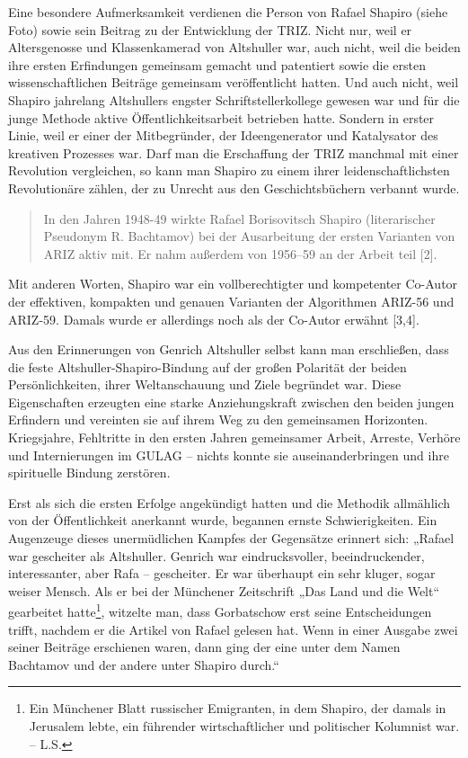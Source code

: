 \documentclass[11pt,a4paper]{article}
\begin{document}
Eine besondere Aufmerksamkeit verdienen die Person von Rafael Shapiro (siehe
Foto) sowie sein Beitrag zu der Entwicklung der TRIZ. Nicht nur, weil er
Altersgenosse und Klassenkamerad von Altshuller war, auch nicht, weil die
beiden ihre ersten Erfindungen gemeinsam gemacht und patentiert sowie die
ersten wissenschaftlichen Beiträge gemeinsam veröffentlicht hatten. Und auch
nicht, weil Shapiro jahrelang Altshullers engster Schriftstellerkollege
gewesen war und für die junge Methode aktive Öffentlichkeitsarbeit betrieben
hatte. Sondern in erster Linie, weil er einer der Mitbegründer, der
Ideengenerator und Katalysator des kreativen Prozesses war. Darf man die
Erschaffung der TRIZ manchmal mit einer Revolution vergleichen, so kann man
Shapiro zu einem ihrer leidenschaftlichsten Revolutionäre zählen, der zu
Unrecht aus den Geschichtsbüchern verbannt wurde.
\begin{quote}
  In den Jahren 1948-49 wirkte Rafael Borisovitsch Shapiro (literarischer
  Pseudonym R. Bachtamov) bei der Ausarbeitung der ersten Varianten von ARIZ
  aktiv mit. Er nahm außerdem von 1956--59 an der Arbeit teil [2].
\end{quote}
Mit anderen Worten, Shapiro war ein vollberechtigter und kompetenter Co-Autor
der effektiven, kompakten und genauen Varianten der Algorithmen ARIZ-56 und
ARIZ-59. Damals wurde er allerdings noch als der Co-Autor erwähnt [3,4].

Aus den Erinnerungen von Genrich Altshuller selbst kann man erschließen, dass
die feste Altshuller-Shapiro-Bindung auf der großen Polarität der beiden
Persönlichkeiten, ihrer Weltanschauung und Ziele begründet war. Diese
Eigenschaften erzeugten eine starke Anziehungskraft zwischen den beiden jungen
Erfindern und vereinten sie auf ihrem Weg zu den gemeinsamen Horizonten.
Kriegsjahre, Fehltritte in den ersten Jahren gemeinsamer Arbeit, Arreste,
Verhöre und Internierungen im GULAG – nichts konnte sie auseinanderbringen
und ihre spirituelle Bindung zerstören.

Erst als sich die ersten Erfolge angekündigt hatten und die Methodik
allmählich von der Öffentlichkeit anerkannt wurde, begannen ernste
Schwierigkeiten. Ein Augenzeuge dieses unermüdlichen Kampfes der Gegensätze
erinnert sich: „Rafael war gescheiter als Altshuller. Genrich war
eindrucksvoller, beeindruckender, interessanter, aber Rafa – gescheiter. Er
war überhaupt ein sehr kluger, sogar weiser Mensch.  Als er bei der Münchener
Zeitschrift „Das Land und die Welt“ gearbeitet hatte\footnote{Ein Münchener
  Blatt russischer Emigranten, in dem Shapiro, der damals in Jerusalem lebte,
  ein führender wirtschaftlicher und politischer Kolumnist war. -- L.S.},
witzelte man, dass Gorbatschow erst seine Entscheidungen trifft, nachdem er
die Artikel von Rafael gelesen hat. Wenn in einer Ausgabe zwei seiner Beiträge
erschienen waren, dann ging der eine unter dem Namen Bachtamov und der andere
unter Shapiro durch.“
\end{document}
